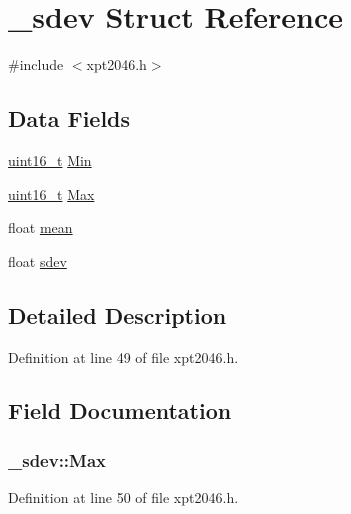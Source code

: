 \hypertarget{struct__sdev}{}\section{\+\_\+sdev Struct Reference}
\label{struct__sdev}


{\ttfamily \#include $<$xpt2046.\+h$>$}

\subsection*{Data Fields}
\begin{DoxyCompactItemize}
\item 
\hyperlink{send_8c_a273cf69d639a59973b6019625df33e30}{uint16\+\_\+t} \hyperlink{struct__sdev_ad496630f4d9975834148dcff8e2475c6}{Min}
\item 
\hyperlink{send_8c_a273cf69d639a59973b6019625df33e30}{uint16\+\_\+t} \hyperlink{struct__sdev_a72bab17004f1930230095b909e87c84f}{Max}
\item 
float \hyperlink{struct__sdev_a2bd0cf80fd334fabaac9100a2538bcb5}{mean}
\item 
float \hyperlink{struct__sdev_a053a14f9e4bd729ce23aafdb1e69e48a}{sdev}
\end{DoxyCompactItemize}


\subsection{Detailed Description}


Definition at line 49 of file xpt2046.\+h.



\subsection{Field Documentation}
\subsubsection[{\texorpdfstring{Max}{Max}}]{ \+\_\+sdev\+::\+Max}\hypertarget{struct__sdev_a72bab17004f1930230095b909e87c84f}{}\label{struct__sdev_a72bab17004f1930230095b909e87c84f}


Definition at line 50 of file xpt2046.\+h.

